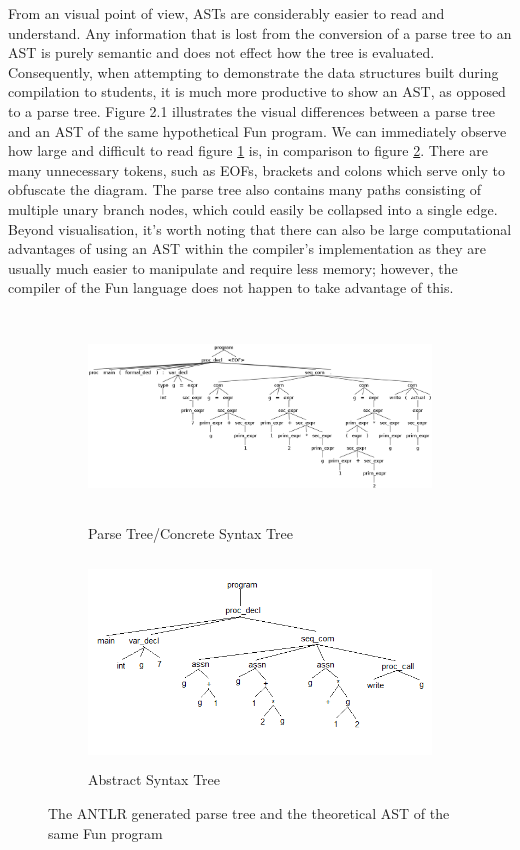 \documentclass{l4proj}
\begin{document}
From an visual point of view, ASTs are considerably easier to read and understand. Any information that is lost from the conversion of a parse tree to an AST is purely semantic and does not effect how the tree is evaluated. Consequently, when attempting to demonstrate the data structures built during compilation to students, it is much more productive to show an AST, as opposed to a parse tree. Figure 2.1 illustrates the visual differences between a parse tree and an AST of the same hypothetical Fun program. We can immediately observe how large and difficult to read figure \ref{fig:ANTLR-parse-tree} is, in comparison to figure \ref{fig:ANTLR-syntax-tree}. There are many unnecessary tokens, such as EOFs, brackets and colons which serve only to obfuscate the diagram. The parse tree also contains many paths consisting of multiple unary branch nodes, which could easily be collapsed into a single edge. Beyond visualisation, it's worth noting that there can  also be large computational advantages of using an AST within the compiler's implementation as they are usually much easier to manipulate and require less memory; however, the compiler of the Fun language does not happen to take advantage of this. 

\begin{figure}[h]
	\begin{subfigure}[b]{0.5\textwidth}
		\includegraphics[height=5.5cm,width=\linewidth]{images/2-2a.png}
		\caption{Parse Tree/Concrete Syntax Tree}
		\label{fig:ANTLR-parse-tree}
	\end{subfigure}
	\begin{subfigure}[b]{0.5\textwidth}
		\includegraphics[height=5.5cm,width=\linewidth]{images/2-2b.png}
		\caption{Abstract Syntax Tree}
		\label{fig:ANTLR-syntax-tree}
	\end{subfigure}
	\caption{The ANTLR generated parse tree and the theoretical AST of the same Fun program}\label{fig:parse-abstract-tree}	
\end{figure}
\end{document}
